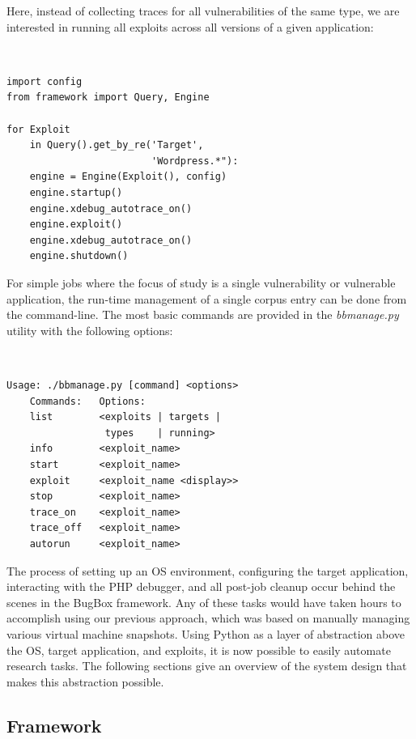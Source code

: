 \documentclass[letterpaper,twocolumn,10pt]{article}
\begin{document}

Here, instead of collecting traces for all vulnerabilities of the same type, we are interested in running all exploits across all versions of a given application:

\begin{minipage}{\textwidth}
{\tt \footnotesize
\begin{lstlisting}
import config
from framework import Query, Engine

for Exploit 
    in Query().get_by_re('Target', 
                         'Wordpress.*"):
    engine = Engine(Exploit(), config)
    engine.startup()
    engine.xdebug_autotrace_on()
    engine.exploit()
    engine.xdebug_autotrace_on()
    engine.shutdown()
\end{lstlisting}
}
\end{minipage}

For simple jobs where the focus of study is a single vulnerability or vulnerable application, the run-time management of a single corpus entry can be done from the command-line. The most basic commands are provided in the \emph{bbmanage.py} utility with the following options:

{\tt \footnotesize
\begin{verbatim}
Usage: ./bbmanage.py [command] <options>
    Commands:   Options:
    list        <exploits | targets | 
                 types    | running>
    info        <exploit_name>
    start       <exploit_name>
    exploit     <exploit_name <display>>
    stop        <exploit_name>
    trace_on    <exploit_name>
    trace_off   <exploit_name>
    autorun     <exploit_name>
\end{verbatim}
}

The process of setting up an OS environment, configuring the target application, interacting with the PHP debugger, and all post-job cleanup occur behind the scenes in the BugBox framework. Any of these tasks would have taken hours to accomplish using our previous approach, which was based on manually managing various virtual machine snapshots. Using Python as a layer of abstraction above the OS, target application, and exploits, it is now possible to easily automate research tasks. The following sections give an overview of the system design that makes this abstraction possible.

\subsection{Framework}
\end{document}
